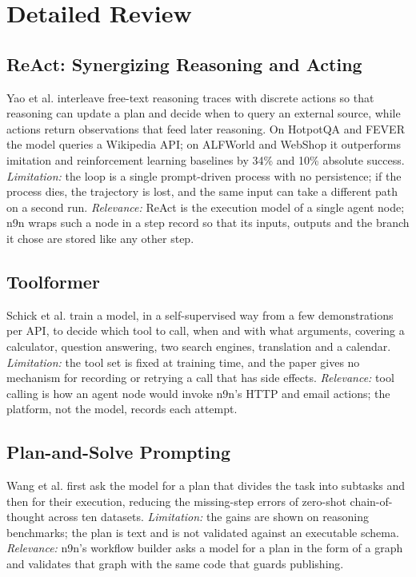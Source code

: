 \documentclass[conference]{IEEEtran}
\begin{document}
\section{Detailed Review}

\subsection{ReAct: Synergizing Reasoning and Acting}
Yao et al. \cite{yao2023react} interleave free-text reasoning traces with discrete actions so that reasoning can update a plan and decide when to query an external source, while actions return observations that feed later reasoning. On HotpotQA and FEVER the model queries a Wikipedia API; on ALFWorld and WebShop it outperforms imitation and reinforcement learning baselines by 34\% and 10\% absolute success. \emph{Limitation:} the loop is a single prompt-driven process with no persistence; if the process dies, the trajectory is lost, and the same input can take a different path on a second run. \emph{Relevance:} ReAct is the execution model of a single agent node; n9n wraps such a node in a step record so that its inputs, outputs and the branch it chose are stored like any other step.

\subsection{Toolformer}
Schick et al. \cite{schick2023toolformer} train a model, in a self-supervised way from a few demonstrations per API, to decide which tool to call, when and with what arguments, covering a calculator, question answering, two search engines, translation and a calendar. \emph{Limitation:} the tool set is fixed at training time, and the paper gives no mechanism for recording or retrying a call that has side effects. \emph{Relevance:} tool calling is how an agent node would invoke n9n's HTTP and email actions; the platform, not the model, records each attempt.

\subsection{Plan-and-Solve Prompting}
Wang et al. \cite{wang2023plansolve} first ask the model for a plan that divides the task into subtasks and then for their execution, reducing the missing-step errors of zero-shot chain-of-thought across ten datasets. \emph{Limitation:} the gains are shown on reasoning benchmarks; the plan is text and is not validated against an executable schema. \emph{Relevance:} n9n's workflow builder asks a model for a plan in the form of a graph and validates that graph with the same code that guards publishing.
\end{document}
